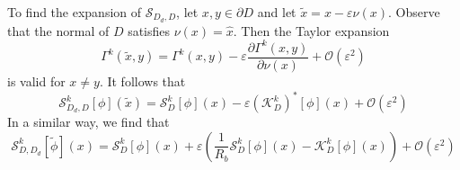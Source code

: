 \documentclass[a4paper]{article}
\theoremstyle{definition}
\renewcommand{\S}{\mathcal{S}}
\newcommand{\K}{\mathcal{K}}
\renewcommand{\O}{\mathcal{O}}
\renewcommand{\epsilon}{\varepsilon}
\begin{document}
To find the expansion of $\S_{D_d,D}$, let $x,y\in \partial D$ and let $\tilde{x} = x - \epsilon \nu(x)$. Observe that the normal of $D$ satisfies $\nu(x) = \hat{x}$. Then the Taylor expansion 
\begin{equation*}
\Gamma^k(\tilde{x},y) = \Gamma^k(x,y) - \epsilon \frac{\partial \Gamma^k(x,y)}{\partial \nu(x)} + \O(\epsilon^2)
\end{equation*}
is valid for $x\neq y$. It follows that 
\begin{equation*}
\S_{D_d,D}^k[\phi](\tilde{x}) = \S_D^k[\phi](x) -\epsilon \left(\K_D^k\right)^*[\phi](x) + \O(\epsilon^2)
\end{equation*}
In a similar way, we find that 
\begin{equation*}
\S_{D,D_d}^k[\tilde{\phi}](x) = \S_D^k[\phi](x) +\epsilon \left(\frac{1}{R_b}\S_D^k[\phi](x) - \K_D^k[\phi](x) \right) + \O(\epsilon^2)
\end{equation*}

{}

\end{document}
